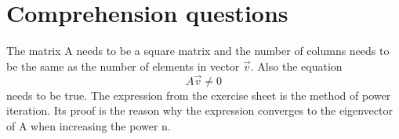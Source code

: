 \setcounter{section}{-1}
\section{Comprehension questions}
The matrix A needs to be a square matrix and the number of columns needs to be the same as the number of elements in vector $\vec{v}$.
Also the equation
\begin{equation}
A \vec{v} \neq 0
\end{equation}
needs to be true.
The expression from the exercise sheet is the method of power iteration. Its proof is the reason why the expression converges to the eigenvector of A when increasing the power n.